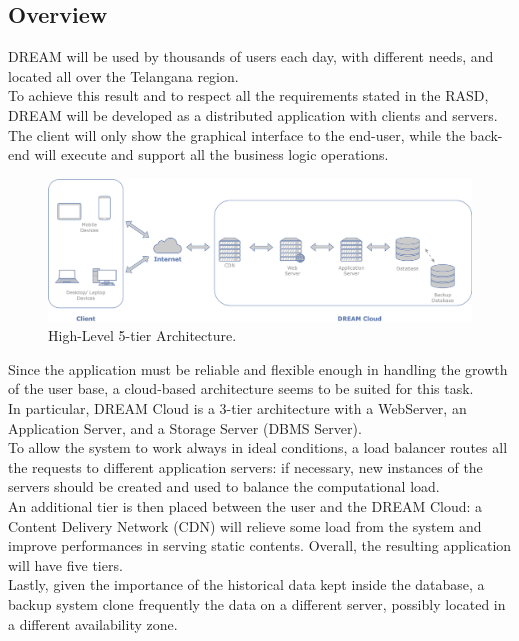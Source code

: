 \subsection{Overview}
DREAM will be used by thousands of users each day, with different needs, and located all over the Telangana region.\\
To achieve this result and to respect all the requirements stated in the RASD, DREAM will be developed as a distributed application with clients and servers.\\
The client will only show the graphical interface to the end-user, while the back-end will execute and support all the business logic operations. 
\begin{figure}[hbt!]
\centering
\includegraphics[width=\textwidth]{../images_diagrams/dd/highlevel_arch.png}
\caption{High-Level 5-tier Architecture.}
\label{fig:highLevelArch}
\end{figure}

\noindent
Since the application must be reliable and flexible enough in handling the growth of the user base, a cloud-based architecture seems to be suited for this task.\\
In particular, DREAM Cloud is a 3-tier architecture with a WebServer, an Application Server, and a Storage Server (DBMS Server).\\
To allow the system to work always in ideal conditions, a load balancer routes all the requests to different application servers: if necessary, new instances of the servers should be created and used to balance the computational load.\\
An additional tier is then placed between the user and the DREAM Cloud: a Content Delivery Network (CDN) will relieve some load from the system and improve performances in serving static contents. Overall, the resulting application will have five tiers.\\
Lastly, given the importance of the historical data kept inside the database, a backup system clone frequently the data on a different server, possibly located in a different availability zone.\\ 

